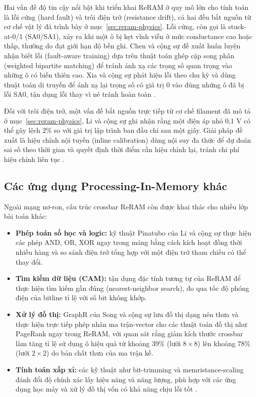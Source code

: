 \documentclass[12pt,a4paper]{article}
\begin{document}
Hai vấn đề độ tin cậy nổi bật khi triển khai ReRAM ở quy mô lớn cho tính toán là lỗi cứng (hard fault) và trôi điện trở (resistance drift), cả hai đều bắt nguồn từ cơ chế vật lý đã trình bày ở mục~\ref{sec:reram-physics}. Lỗi cứng, còn gọi là stuck-at-0/1 (SA0/SA1), xảy ra khi một ô bị kẹt vĩnh viễn ở mức conductance cao hoặc thấp, thường do đạt giới hạn độ bền ghi. Chen và cộng sự đề xuất huấn luyện nhận biết lỗi (fault-aware training) dựa trên thuật toán ghép cặp song phân (weighted bipartite matching) để tránh ánh xạ các trọng số quan trọng vào những ô có biến thiên cao. Xia và cộng sự phát hiện lỗi theo chu kỳ và dùng thuật toán di truyền để ánh xạ lại trọng số có giá trị 0 vào đúng những ô đã bị lỗi SA0, tận dụng lỗi thay vì né tránh hoàn toàn \cite{mittal2019}.

Đối với trôi điện trở, một vấn đề bắt nguồn trực tiếp từ cơ chế filament đã mô tả ở mục~\ref{sec:reram-physics}, Li và cộng sự ghi nhận rằng một điện áp nhỏ 0,1 V có thể gây lệch 2\% so với giá trị lập trình ban đầu chỉ sau một giây. Giải pháp đề xuất là hiệu chỉnh nội tuyến (inline calibration) dùng nội suy đa thức để dự đoán sai số theo thời gian và quyết định thời điểm cần hiệu chỉnh lại, tránh chi phí hiệu chỉnh liên tục \cite{mittal2019}.

\subsection{Các ứng dụng Processing-In-Memory khác}

Ngoài mạng nơ-ron, cấu trúc crossbar ReRAM còn được khai thác cho nhiều lớp bài toán khác:

\begin{itemize}[leftmargin=1.5em]
    \item \textbf{Phép toán số học và logic:} kỹ thuật Pinatubo của Li và cộng sự thực hiện các phép AND, OR, XOR ngay trong mảng bằng cách kích hoạt đồng thời nhiều hàng và so sánh điện trở tổng hợp với một điện trở tham chiếu có thể thay đổi.
    \item \textbf{Tìm kiếm dữ liệu (CAM):} tận dụng đặc tính tương tự của ReRAM để thực hiện tìm kiếm gần đúng (nearest-neighbor search), đo qua tốc độ phóng điện của bitline tỉ lệ với số bit không khớp.
    \item \textbf{Xử lý đồ thị:} GraphR của Song và cộng sự lưu đồ thị dạng nén thưa và thực hiện trực tiếp phép nhân ma trận-vector cho các thuật toán đồ thị như PageRank ngay trong ReRAM, với quan sát rằng giảm kích thước crossbar làm tăng tỉ lệ sử dụng ô hiệu quả từ khoảng 39\% (lưới $8\times8$) lên khoảng 78\% (lưới $2\times2$) do bản chất thưa của ma trận kề.
    \item \textbf{Tính toán xấp xỉ:} các kỹ thuật như bit-trimming và memristance-scaling đánh đổi độ chính xác lấy hiệu năng và năng lượng, phù hợp với các ứng dụng học máy và xử lý đồ thị vốn có khả năng chịu lỗi tốt \cite{mittal2019}.
\end{itemize}
\end{document}
